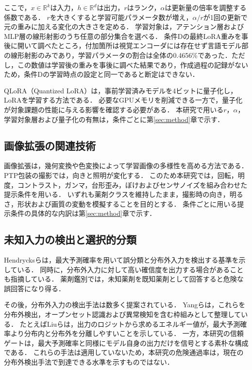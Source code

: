 \documentclass[uplatex,dvipdfmx]{jsarticle}
\begin{document}
ここで，$x \in \mathbb{R}^{k}$は入力，$h \in \mathbb{R}^{d}$は出力，$r$はランク，$\alpha$は更新量の倍率を調整する係数である．
$r$を大きくすると学習可能パラメータ数が増え，$\alpha/r$が1回の更新で元の重みに加える変化の大きさを定める．
学習対象は，アテンション層およびMLP層の線形射影のうち任意の部分集合を選べる．
条件Dの最終LoRA重みを事後に開いて調べたところ，付加箇所は視覚エンコーダには存在せず言語モデル部の線形射影のみであり，学習パラメータの割合は全体の0.4656\%であった．ただし，この数値は学習後の重みを事後に調べた結果であり，作成過程の記録がないため，条件Dの学習時点の設定と同一であると断定はできない．

QLoRA（Quantized LoRA）は，事前学習済みモデルを4ビットに量子化し，LoRAを学習する方法である\cite{dettmers2023qlora}．
必要なGPUメモリを削減できる一方で，量子化が対象課題の性能に与える影響を確認する必要がある．
本研究で用いる$r$，$\alpha$，学習対象層および量子化の有無は，条件ごとに第\ref{sec:method}章で示す．

\subsection{画像拡張の関連技術}

画像拡張は，幾何変換や色変換によって学習画像の多様性を高める方法である\cite{shorten2019augmentation}．
PTP包装の撮影では，向きと照明が変化する．
このため本研究では，回転，明度，コントラスト，ガンマ，台形歪み，ぼけおよびセンサノイズを組み合わせた提示条件を用いる．
いずれも薬剤クラスを維持したまま，撮影時の向き，明るさ，形状および画質の変動を模擬することを目的とする．
条件ごとに用いる提示条件の具体的な内訳は第\ref{sec:method}章で示す．

\subsection{未知入力の検出と選択的分類}

Hendrycksらは，最大予測確率を用いて誤分類と分布外入力を検出する基準を示している\cite{hendrycks2017ood}．
同時に，分布外入力に対して高い確信度を出力する場合があることも指摘している．
薬剤鑑別では，未知薬剤を既知薬剤として回答すると危険な誤回答になり得る．

その後，分布外入力の検出手法は数多く提案されている．
Yangらは，これらを分布外検出，オープンセット認識および異常検知を含む枠組みとして整理している\cite{yang2024oodsurvey}．
たとえばLiuらは，出力のロジットから求めるエネルギー値が，最大予測確率より分布内と分布外を分離しやすいことを示している\cite{liu2020energy}．
一方，本研究の信頼ゲートは，最大予測確率と同様にモデル自身の出力だけを信号とする素朴な構成である．
これらの手法は適用していないため，本研究の危険通過率は，現在の分布外検出手法で到達できる水準を示すものではない．
\end{document}
